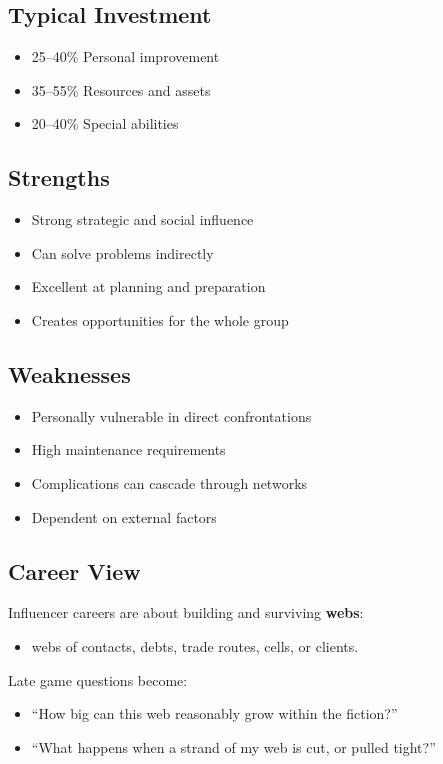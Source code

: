 \subsection*{Typical Investment}
\begin{itemize}
\item 25--40\% Personal improvement
\item 35--55\% Resources and assets
\item 20--40\% Special abilities
\end{itemize}

\subsection*{Strengths}
\begin{itemize}
\item Strong strategic and social influence
\item Can solve problems indirectly
\item Excellent at planning and preparation
\item Creates opportunities for the whole group
\end{itemize}

\subsection*{Weaknesses}
\begin{itemize}
\item Personally vulnerable in direct confrontations
\item High maintenance requirements
\item Complications can cascade through networks
\item Dependent on external factors
\end{itemize}

\subsection*{Career View}

Influencer careers are about building and surviving \textbf{webs}:
\begin{itemize}
  \item webs of contacts, debts, trade routes, cells, or clients.
\end{itemize}
Late game questions become:
\begin{itemize}
  \item ``How big can this web reasonably grow within the fiction?''
  \item ``What happens when a strand of my web is cut, or pulled tight?''
\end{itemize}

